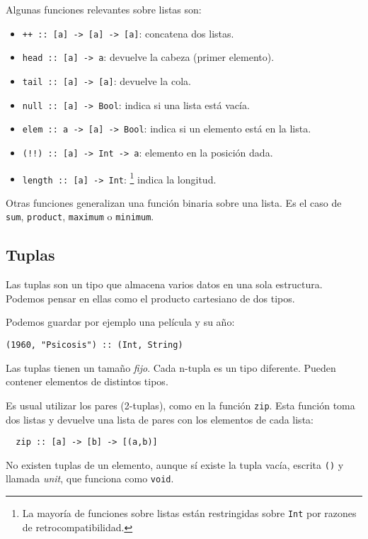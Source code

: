 Algunas funciones relevantes sobre listas son:

\begin{itemize}
  \item \texttt{++ :: [a] -> [a] -> [a]}: concatena dos listas.
  \item \texttt{head :: [a] -> a}: devuelve la cabeza (primer elemento).
  \item \texttt{tail :: [a] -> [a]}: devuelve la cola.
  \item \texttt{null :: [a] -> Bool}: indica si una lista está vacía.
  \item \texttt{elem :: a -> [a] -> Bool}: indica si un elemento está en la lista.
  \item \texttt{(!!) :: [a] -> Int -> a}: elemento en la posición dada.
  \item \texttt{length :: [a] -> Int}:
  \footnote{La mayoría de funciones sobre listas están restringidas sobre \texttt{Int}
  por razones de retrocompatibilidad.} indica la longitud.
\end{itemize}

Otras funciones generalizan una función binaria sobre una lista. Es el caso de
\texttt{sum}, \texttt{product}, \texttt{maximum} o \texttt{minimum}.

\subsection{Tuplas}
Las tuplas son un tipo que almacena varios datos en una sola estructura.
Podemos pensar en ellas como el producto cartesiano de dos tipos.

Podemos guardar por ejemplo una película y su año:

\begin{lstlisting}
(1960, "Psicosis") :: (Int, String)
\end{lstlisting}

Las tuplas tienen un tamaño \textit{fijo}. Cada n-tupla es un tipo diferente.
Pueden contener elementos de distintos tipos.

Es usual utilizar los pares (2-tuplas), como en la función \texttt{zip}.
Esta función toma dos listas y devuelve una lista de pares con los elementos de
cada lista:

\begin{lstlisting}
  zip :: [a] -> [b] -> [(a,b)]
\end{lstlisting}

No existen tuplas de un elemento, aunque sí existe la tupla vacía, escrita \texttt{()}
y llamada \textit{unit}, que funciona como \texttt{void}.
